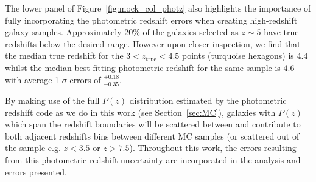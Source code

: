 The lower panel of Figure~\ref{fig:mock_col_photz} also highlights the importance of fully incorporating the photometric redshift errors when creating high-redshift galaxy samples. Approximately 20\% of the galaxies selected as $z\sim5$ have true redshifts below the desired range. However upon closer inspection, we find that the median true redshift for the $3 < z_{\text{true}} < 4.5$ points (turquoise hexagons) is 4.4 whilst the median best-fitting photometric redshift for the same sample is $4.6$ with average 1-$\sigma$ errors of $^{+0.18}_{-0.35}$.

By making use of the full $P(z)$ distribution estimated by the photometric redshift code as we do in this work (see Section~\ref{sec:MC}), galaxies with $P(z)$ which span the redshift boundaries will be scattered between and contribute to both adjacent redshifts bins between different MC samples (or scattered out of the sample e.g. $z < 3.5$ or $z > 7.5$). Throughout this work, the errors resulting from this photometric redshift uncertainty are incorporated in the analysis and errors presented.

